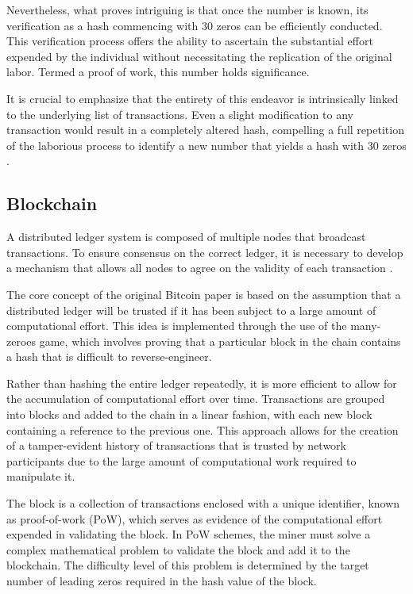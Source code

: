 Nevertheless, what proves intriguing is that once the number is known, its verification as a hash commencing with 30 zeros can be efficiently conducted. This verification process offers the ability to ascertain the substantial effort expended by the individual without necessitating the replication of the original labor. Termed a proof of work, this number holds significance.

It is crucial to emphasize that the entirety of this endeavor is intrinsically linked to the underlying list of transactions. Even a slight modification to any transaction would result in a completely altered hash, compelling a full repetition of the laborious process to identify a new number that yields a hash with 30 zeros \cite{nakamoto2008bitcoin}.

\subsection{Blockchain}
A distributed ledger system is composed of multiple nodes that broadcast transactions. To ensure consensus on the correct ledger, it is necessary to develop a mechanism that allows all nodes to agree on the validity of each transaction \cite{el2018review}.

The core concept of the original Bitcoin paper \cite{nakamoto2008bitcoin} is based on the assumption that a distributed ledger will be trusted if it has been subject to a large amount of computational effort. This idea is implemented through the use of the many-zeroes game, which involves proving that a particular block in the chain contains a hash that is difficult to reverse-engineer.

Rather than hashing the entire ledger repeatedly, it is more efficient to allow for the accumulation of computational effort over time. Transactions are grouped into blocks and added to the chain in a linear fashion, with each new block containing a reference to the previous one. This approach allows for the creation of a tamper-evident history of transactions that is trusted by network participants due to the large amount of computational work required to manipulate it.

%

The block is a collection of transactions enclosed with a unique identifier, known as proof-of-work (PoW), which serves as evidence of the computational effort expended in validating the block. In PoW schemes, the miner must solve a complex mathematical problem to validate the block and add it to the blockchain. The difficulty level of this problem is determined by the target number of leading zeros required in the hash value of the block.

